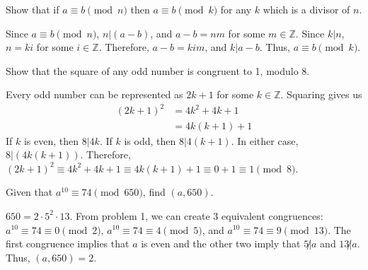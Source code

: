 \documentclass{article}
\begin{document}
\begin{problem}{}{}
    Show that if $a\equiv b\pmod{n}$ then $a\equiv b\pmod{k}$ for any $k$ which is a divisor of $n$.
\end{problem}
\begin{solution}{}{}
    Since $a\equiv b\pmod{n}$, $n|(a-b)$, and $a-b=nm$ for some $m\in\mathbb{Z}$. Since $k|n$, $n=ki$ for some $i\in\mathbb{Z}$. Therefore, $a-b=kim$, and $k|a-b$. Thus, $a\equiv b\pmod{k}$.
\end{solution}

\begin{problem}{}{}
    Show that the square of any odd number is congruent to 1, modulo 8.
\end{problem}
\begin{solution}{}{}
    Every odd number can be represented as $2k+1$ for some $k\in\mathbb{Z}$. Squaring gives us 
    \begin{align*}
        (2k+1)^2 &= 4k^2 + 4k + 1 \\
        &= 4k(k + 1) + 1
    \end{align*}
    If $k$ is even, then $8|4k$. If $k$ is odd, then $8|4(k+1)$. In either case, $8|(4k(k+1))$. Therefore, $(2k+1)^2\equiv 4k^2 + 4k + 1\equiv 4k(k + 1) + 1\equiv 0+1\equiv 1\pmod{8}$.
\end{solution}

\begin{problem}{}{}
    Given that $a^{10}\equiv74\pmod{650}$, find $(a,650)$.
\end{problem}
\begin{solution}{}{}
    $650=2\cdot5^2\cdot13$. From problem 1, we can create 3 equivalent congruences: $a^{10}\equiv74\equiv0\pmod{2}$, $a^{10}\equiv74\equiv4\pmod{5}$, and $a^{10}\equiv74\equiv9\pmod{13}$. The first congruence implies that $a$ is even and the other two imply that $5\not|a$ and $13\not|a$. Thus, $(a,650)=2$.
\end{solution}
\end{document}
